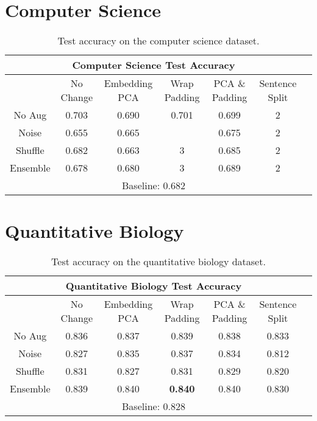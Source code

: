 \section{Computer Science}
\begin{center}
  \begin{table}[H]
 \begin{tabular}{|c||c|c|c|c|c|c|}
  \hline
  \multicolumn{6}{|c|}{\textbf{Computer Science Test Accuracy}}\\ \hline
   & No Change & Embedding PCA & Wrap Padding & PCA \& Padding & Sentence Split\\  \hline
   No Aug & 0.703 & 0.690 & 0.701 & 0.699 & 2 \\      \hline
   Noise & 0.655 & 0.665 &  &  0.675 & 2  \\      \hline
   Shuffle & 0.682 & 0.663 & 3 & 0.685 & 2 \\  \hline
   Ensemble & 0.678 & 0.680 & 3 & 0.689 & 2 \\      \hline
   \multicolumn{6}{|c|}{Baseline: 0.682}\\ \hline
 \end{tabular}
 \caption{Test accuracy on the computer science dataset.}
 \end{table}
\end{center}

\section{Quantitative Biology}
\begin{center}
  \begin{table}[H]
\begin{tabular}{|c||c|c|c|c|c|c|}
  \hline
\multicolumn{6}{|c|}{\textbf{Quantitative Biology Test Accuracy}}\\ \hline
  & No Change & Embedding PCA & Wrap Padding & PCA \& Padding & Sentence Split\\  \hline
  No Aug & 0.836 & 0.837 & 0.839 & 0.838 & 0.833 \\      \hline
  Noise & 0.827 & 0.835 & 0.837 & 0.834 & 0.812  \\      \hline
  Shuffle & 0.831 & 0.827 & 0.831 & 0.829 & 0.820 \\      \hline
  Ensemble & 0.839 & 0.840 & \textbf{0.840} & 0.840 & 0.830 \\      \hline
  \multicolumn{6}{|c|}{Baseline: 0.828}\\ \hline
\end{tabular}
\caption{Test accuracy on the quantitative biology dataset.}
\end{table}
\end{center}
